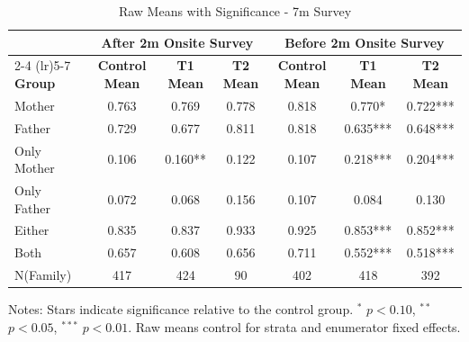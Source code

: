 \begin{table}[htbp]
\centering
\begin{threeparttable}
\caption{Raw Means with Significance  - 7m Survey}
\begin{tabular}{lcccccc}
\toprule
& \multicolumn{3}{c}{After 2m Onsite Survey} & \multicolumn{3}{c}{Before 2m Onsite Survey} \\
\cmidrule(lr){2-4} \cmidrule(lr){5-7}
\textbf{Group} & \textbf{Control Mean} & \textbf{T1 Mean} & \textbf{T2 Mean} & \textbf{Control Mean} & \textbf{T1 Mean} & \textbf{T2 Mean} \\
\midrule
Mother &  0.763 &  0.769 &  0.778 &   0.818 &  0.770* &  0.722*** \\
Father &  0.729 &  0.677 &  0.811 & 0.818 &  0.635*** &  0.648***  \\
Only Mother &  0.106 &  0.160** &  0.122 &   0.107 &  0.218*** &  0.204***  \\
Only Father &  0.072 &  0.068 &  0.156 &   0.107 &  0.084 &  0.130  \\
Either &  0.835 &  0.837 &  0.933 &  0.925 &  0.853*** &  0.852*** \\
Both &  0.657 &  0.608 &  0.656 & 0.711 &  0.552*** &  0.518*** \\
N(Family) & 417 & 424 & 90  &  402 & 418 & 392   \\
\bottomrule
\end{tabular}
\begin{tablenotes}
\small
Notes: Stars indicate significance relative to the control group. 
$^{*}$ $p<0.10$, $^{**}$ $p<0.05$, $^{***}$ $p<0.01$.
Raw means control for strata and enumerator fixed effects.
\end{tablenotes}
\end{threeparttable}
\end{table}

